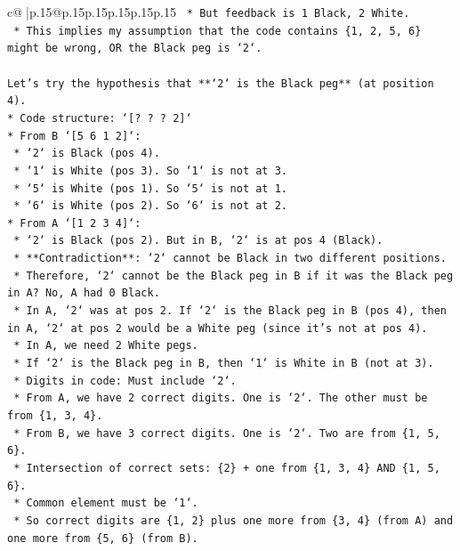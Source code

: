 \documentclass{article}
\begin{document}
{\begin{supertabular}{c@{$\;$}|p{.15\linewidth}@{}p{.15\linewidth}p{.15\linewidth}p{.15\linewidth}p{.15\linewidth}p{.15\linewidth}}
{{{\texttt{                    *   But feedback is 1 Black, 2 White.} \\
\texttt{                    *   This implies my assumption that the code contains \{1, 2, 5, 6\} might be wrong, OR the Black peg is `2`.} \\
\\ 
\texttt{Let's try the hypothesis that **`2` is the Black peg** (at position 4).} \\
\texttt{*   Code structure: `{[}? ? ? 2{]}`} \\
\texttt{*   From B `{[}5 6 1 2{]}`:} \\
\texttt{    *   `2` is Black (pos 4).} \\
\texttt{    *   `1` is White (pos 3). So `1` is not at 3.} \\
\texttt{    *   `5` is White (pos 1). So `5` is not at 1.} \\
\texttt{    *   `6` is White (pos 2). So `6` is not at 2.} \\
\texttt{*   From A `{[}1 2 3 4{]}`:} \\
\texttt{    *   `2` is Black (pos 2). But in B, `2` is at pos 4 (Black).} \\
\texttt{    *   **Contradiction**: `2` cannot be Black in two different positions.} \\
\texttt{    *   Therefore, `2` cannot be the Black peg in B if it was the Black peg in A? No, A had 0 Black.} \\
\texttt{    *   In A, `2` was at pos 2. If `2` is the Black peg in B (pos 4), then in A, `2` at pos 2 would be a White peg (since it's not at pos 4).} \\
\texttt{    *   In A, we need 2 White pegs.} \\
\texttt{    *   If `2` is the Black peg in B, then `1` is White in B (not at 3).} \\
\texttt{    *   Digits in code: Must include `2`.} \\
\texttt{    *   From A, we have 2 correct digits. One is `2`. The other must be from \{1, 3, 4\}.} \\
\texttt{    *   From B, we have 3 correct digits. One is `2`. Two are from \{1, 5, 6\}.} \\
\texttt{    *   Intersection of correct sets: \{2\} + one from \{1, 3, 4\} AND \{1, 5, 6\}.} \\
\texttt{    *   Common element must be `1`.} \\
\texttt{    *   So correct digits are \{1, 2\} plus one more from \{3, 4\} (from A) and one more from \{5, 6\} (from B).} \\
}}}
\end{supertabular}}
\end{document}

